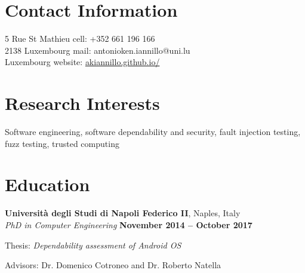 \documentclass[margin,line]{resume}
\newif\ifReferences
\newif\ifOnline
\begin{document}
\Referencesfalse
\Onlinefalse


\begin{resume}


\section{\mysidestyle Contact Information}
\ifOnline
	mail: ak.iannillo@gmail.com	 							\hfill Luxembourg\\
\else
    5 Rue St Mathieu				                   			\hfill cell: +352 661 196 166\\
    2138 Luxembourg								        \hfill mail: antonioken.iannillo@uni.lu\\
    Luxembourg										\hfill website: \url{akiannillo.github.io/}\\
\fi




\section{\mysidestyle Research Interests}
Software engineering, software dependability and security, fault injection testing, fuzz testing, trusted computing


\section{\mysidestyle Education}
\textbf{Universit\`a degli Studi di Napoli Federico II}, Naples, Italy \vspace{1mm}\\%
\textsl{PhD in Computer Engineering} \hfill \textbf{November 2014 -- October 2017}\vspace{-3mm}\\\vspace{-1mm}%
\begin{list2}
	\item Thesis: \textsl{Dependability assessment of Android OS}
	\item Advisors: Dr. Domenico Cotroneo and Dr. Roberto Natella
\end{list2}


\end{resume}
\end{document}
